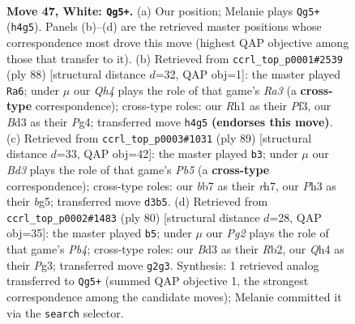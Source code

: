 \documentclass[11pt]{article}
\begin{document}
\clearpage

\begin{figure}[p]\centering
\begin{subfigure}{0.46\textwidth}\centering
\resizebox{\linewidth}{!}{%
\newchessgame
\chessboard[
  setfen={5r2/1b4k1/8/8/7Q/3B3P/1p4P1/6KR w - - 3 47},
  showmover=false,
  pgfstyle=straightmove, color=movearrow, markmove={h4-g5}
]}
\caption{}
\end{subfigure}\hfill
\begin{subfigure}{0.46\textwidth}\centering
\resizebox{\linewidth}{!}{%
\newchessgame
\chessboard[
  setfen={8/8/5pk1/8/6Pp/R4P2/P5K1/r7 w - - 5 45},
  showmover=false,
  pgfstyle=straightmove, color=movearrow, markmove={a3-a6}
]}
\caption{}
\end{subfigure}
\\[4pt]
\begin{subfigure}{0.46\textwidth}\centering
\resizebox{\linewidth}{!}{%
\newchessgame
\chessboard[
  setfen={8/1kp4R/8/2p3B1/1p6/5P2/6K1/1r6 b - - 0 45},
  showmover=false,
  pgfstyle=straightmove, color=movearrow, markmove={b4-b3}
]}
\caption{}
\end{subfigure}\hfill
\begin{subfigure}{0.46\textwidth}\centering
\resizebox{\linewidth}{!}{%
\newchessgame
\chessboard[
  setfen={1r6/6pp/8/4k3/1P2p3/2K3P1/1R5P/8 w - - 8 41},
  showmover=false,
  pgfstyle=straightmove, color=movearrow, markmove={b4-b5}
]}
\caption{}
\end{subfigure}
\caption{\textbf{Move 47, White: \texttt{Qg5+}.} (a) Our position; Melanie plays \texttt{Qg5+} (\texttt{h4g5}). Panels (b)--(d) are the retrieved master positions whose correspondence most drove this move (highest QAP objective among those that transfer to it). (b) Retrieved from \texttt{ccrl\_top\_p0001\#2539} (ply 88) [structural distance $d$=32, QAP obj=1]: the master played \texttt{Ra6}; under $\mu$ our \emph{Qh4} plays the role of that game's \emph{Ra3} (a \textbf{cross-type} correspondence); cross-type roles: our \emph{R}h1 as their \emph{P}f3, our \emph{B}d3 as their \emph{P}g4; transferred move \texttt{h4g5} \textbf{(endorses this move)}. (c) Retrieved from \texttt{ccrl\_top\_p0003\#1031} (ply 89) [structural distance $d$=33, QAP obj=42]: the master played \texttt{b3}; under $\mu$ our \emph{Bd3} plays the role of that game's \emph{Pb5} (a \textbf{cross-type} correspondence); cross-type roles: our \emph{b}b7 as their \emph{r}h7, our \emph{P}h3 as their \emph{b}g5; transferred move \texttt{d3b5}. (d) Retrieved from \texttt{ccrl\_top\_p0002\#1483} (ply 80) [structural distance $d$=28, QAP obj=35]: the master played \texttt{b5}; under $\mu$ our \emph{Pg2} plays the role of that game's \emph{Pb4}; cross-type roles: our \emph{B}d3 as their \emph{R}b2, our \emph{Q}h4 as their \emph{P}g3; transferred move \texttt{g2g3}. Synthesis: 1 retrieved analog transferred to \texttt{Qg5+} (summed QAP objective 1, the strongest correspondence among the candidate moves); Melanie committed it via the \texttt{search} selector.}
\label{fig:thought-m92}
\end{figure}
\end{document}
